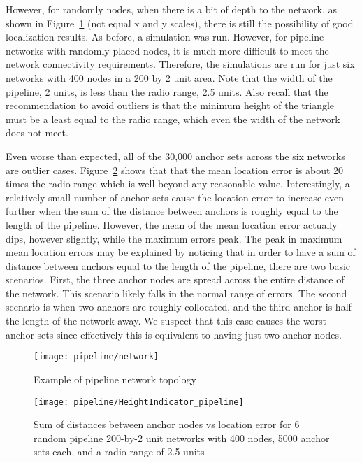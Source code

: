 However, for randomly nodes, when there is a bit of depth to the network, as shown in Figure~\ref{fig:pipeline} (not equal x and y scales), there is still the possibility of good localization results.  As before, a simulation was run.  However, for pipeline networks with randomly placed nodes, it is much more difficult to meet the network connectivity requirements.  Therefore, the simulations are run for just six networks with 400 nodes in a 200 by 2 unit area.  Note that the width of the pipeline, 2 units, is less than the radio range, 2.5 units.  Also recall that the recommendation to avoid outliers is that the minimum height of the triangle must be a least equal to the radio range, which even the width of the network does not meet. 

Even worse than expected, all of the 30,000 anchor sets across the six networks are outlier cases.  Figure~\ref{fig:pipelineindicator} shows that that the mean location error is about 20 times the radio range which is well beyond any reasonable value. Interestingly, a relatively small number of anchor sets cause the location error to increase even further when the sum of the distance between anchors is roughly equal to the length of the pipeline.  However, the mean of the mean location error actually dips, however slightly, while the maximum errors peak.  The peak in maximum mean location errors may be explained by noticing that in order to have a sum of distance between anchors equal to the length of the pipeline, there are two basic scenarios.  First, the three anchor nodes are spread across the entire distance of the network.  This scenario likely falls in the normal range of errors.  The second scenario is when two anchors are roughly collocated, and the third anchor is half the length of the network away.  We suspect that this case causes the worst anchor sets since effectively this is equivalent to having just two anchor nodes.

\begin{figure}
  \centering
	\texttt{[image: pipeline/network]}
	\caption{Example of pipeline network topology}
	\label{fig:pipeline}
\end{figure}

\begin{figure}
  \centering
	\texttt{[image: pipeline/HeightIndicator\_pipeline]}
	\caption[Sum of distances between anchor nodes vs location error in a pipeline topology]{Sum of distances between anchor nodes vs location error for 6 random pipeline 200-by-2 unit networks with 400 nodes, 5000 anchor sets each, and a radio range of 2.5 units}
	\label{fig:pipelineindicator}
\end{figure}

